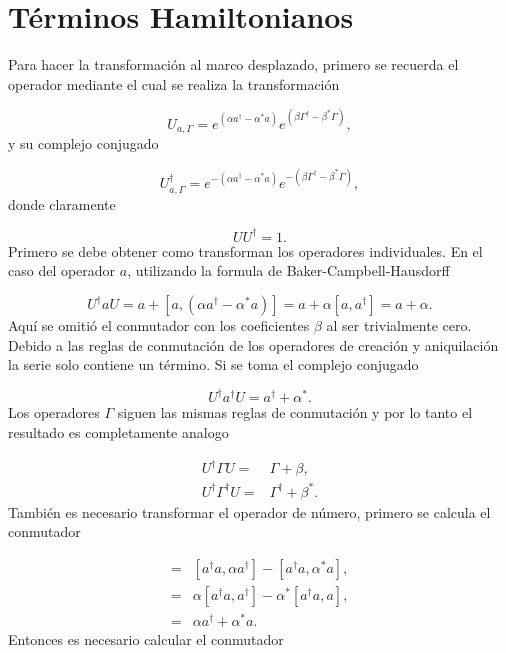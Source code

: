 \documentclass[a4paper,10pt]{report}
\begin{document}
\section{Términos Hamiltonianos}

Para hacer la transformación al marco desplazado, primero se recuerda el operador mediante el cual se realiza la transformación

\begin{equation}
U_{a,\Gamma} = e^{(\alpha a^\dagger - \alpha^*a)}e^{(\beta \Gamma^\dagger - \beta^*\Gamma)},
\end{equation} y su complejo conjugado

\begin{equation}
U_{a,\Gamma}^{\dagger} = e^{-(\alpha a^\dagger - \alpha^*a)}e^{-(\beta \Gamma^\dagger - \beta^*\Gamma)},
\end{equation} donde claramente

\begin{equation}
UU^{\dagger} = 1.
\end{equation} Primero se debe obtener como transforman los operadores individuales. En el caso del operador $a$, utilizando la formula de Baker-Campbell-Hausdorff

\begin{equation}
U^{\dagger}aU = a +[a,(\alpha a^\dagger - \alpha^*a)] = a +\alpha[a,a^{\dagger}]=a+\alpha.
\end{equation} Aquí se omitió el conmutador con los coeficientes $\beta$ al ser trivialmente cero. Debido a las reglas de conmutación de los operadores de creación y aniquilación la serie solo contiene un término. Si se toma el complejo conjugado

\begin{equation}
U^{\dagger}a^{\dagger}U = a^\dagger + \alpha^*.
\end{equation} Los operadores $\Gamma$ siguen las mismas reglas de conmutación y por lo tanto el resultado es completamente analogo

\begin{align}
U^{\dagger}\Gamma U =& \Gamma + \beta, \\
U^{\dagger}\Gamma^\dagger U =& \Gamma^\dagger + \beta^*.
\end{align} También es necesario transformar el operador de número, primero se calcula el conmutador

\begin{align*}
[a^\dagger a,(\alpha a^\dagger - \alpha^*a) ] =& [a^\dagger a,\alpha a^\dagger] - [a^\dagger a,\alpha^*a],\\
=&\alpha [a^\dagger a,a^\dagger] - \alpha^*[a^\dagger a,a],\\
=&\alpha a^{\dagger} + \alpha^* a.
\end{align*} Entonces es necesario calcular el conmutador
\end{document}

